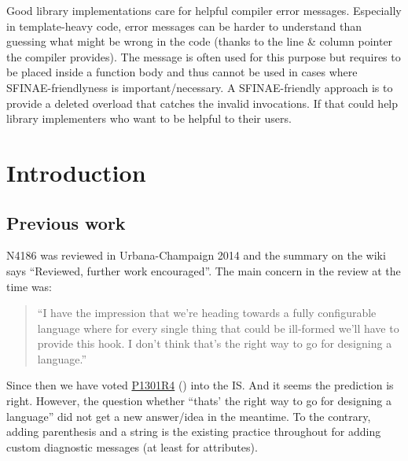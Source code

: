 \newcommand\wgTitle{\texttt{= delete} should have a reason}
\newcommand\wgName{Matthias Kretz <m.kretz@gsi.de>, Augustin?, LWG ?}
\newcommand\wgDocumentNumber{DDSHRR0}
\newcommand\wgPreviousDocumentNumber{N4186}
\newcommand\wgGroup{EWG-I}
\newcommand\wgTarget{\CC{}23}

\usepackage{mymacros}
\usepackage{wg21}
\usepackage{changelog}
\usepackage{underscore}

\newcommand\wglink[1]{\href{https://wg21.link/#1}{#1}}


\begin{wgTitlepage}
  Good library implementations care for helpful compiler error messages.
  Especially in template-heavy code, error messages can be harder to understand than guessing what might be wrong in the code (thanks to the line \& column pointer the compiler provides).
  The  message is often used for this purpose but requires to be placed inside a function body and thus cannot be used in cases where SFINAE-friendlyness is important/necessary.
  A SFINAE-friendly approach is to provide a deleted overload that catches the invalid invocations.
  If  that could help library implementers who want to be helpful to their users.
\end{wgTitlepage}

\pagestyle{scrheadings}




\section{Introduction}

\subsection{Previous work}
N4186 was reviewed in Urbana-Champaign 2014 and the summary on the wiki says “Reviewed, further work encouraged”.
The main concern in the review at the time was:
\begin{quote}{}
“I have the impression that we're heading towards a fully configurable language where for every single thing that could be ill-formed we'll have to provide this hook.
I don't think that's the right way to go for designing a language.”
\end{quote}
Since then we have voted \wglink{P1301R4} () into the IS.
And it seems the prediction is right.
However, the question whether “thats' the right way to go for designing a language” did not get a new answer/idea in the meantime.
To the contrary, adding parenthesis and a string is the existing practice throughout \CC{} for adding custom diagnostic messages (at least for attributes).

